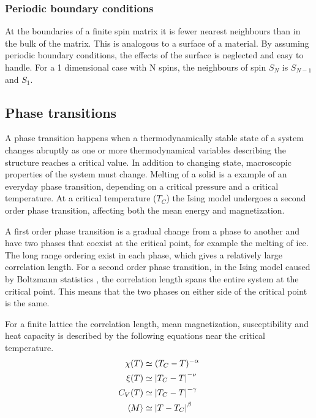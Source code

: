 \subsubsection{Periodic boundary conditions}

At the boundaries of a finite spin matrix it is fewer nearest neighbours than in the bulk of the matrix. This is analogous to a surface of a material. By assuming periodic boundary conditions, the effects of the surface is neglected and easy to handle. For a 1 dimensional case with N spins, the neighbours of spin $ S_N $ is $ S_{N-1} $ and $ S_1 $. 

\subsection{Phase transitions}

A phase transition happens when a thermodynamically stable state of a system changes abruptly as one or more thermodynamical  variables describing the structure reaches a critical value. In addition to changing state, macroscopic properties of the system must change. Melting of a solid is a example of an everyday phase transition, depending on a critical pressure and a critical temperature. At a critical temperature ($ T_C $) the Ising model undergoes a second order phase transition, affecting both the mean energy and magnetization. 


A first order phase transition is a gradual change from a phase to another and have two phases that coexist at the critical point, for example the melting of ice. The long range ordering exist in each phase, which gives a relatively large correlation length. For a second order phase transition, in the Ising model caused by  Boltzmann statistics , the correlation length spans the entire system at the critical point. This means that the two phases on either side of the critical point is the same. 

For a finite lattice the correlation length, mean magnetization,  susceptibility and heat capacity  is described by the following equations  near the critical temperature. 
\begin{align}
	\chi(T) &\simeq (T_C-T)^{-\alpha}\label{eq: X_TC}\\
		\xi (T) &\simeq \abs{T_C-T}^{-\nu} \\
	C_V(T) &\simeq \abs{T_C-T}^{-\gamma} \label{eq:C_V_finite}\\
		\langle M\rangle &\simeq \abs{T-T_C}^{\beta}\\
 \end{align}

